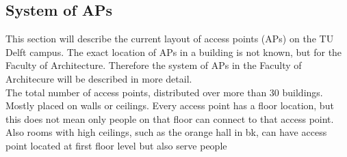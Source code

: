 \subsection{System of APs}\label{systemofaps}
This section will describe the current layout of access points (APs) on the TU Delft campus. The exact location of APs in a building is not known, but for the Faculty of Architecture. Therefore the system of APs in the Faculty of Architecure will be described in more detail. 
\\
The total number of access points, distributed over more than 30 buildings. 
Mostly placed on walls or ceilings. Every access point has a floor location, but this does not mean only people on that floor can connect to that access point. Also rooms with high ceilings, such as the orange hall in bk, can have access point located at first floor level but also serve people 

